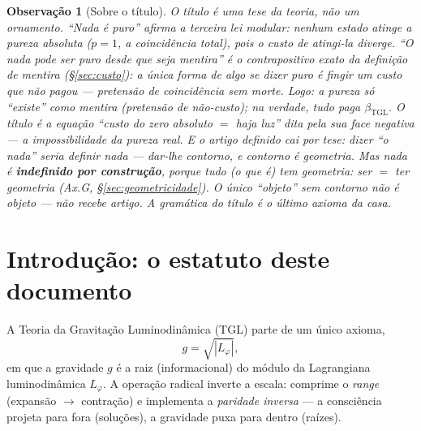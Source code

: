\documentclass[11pt,a4paper]{article}
\newcommand{\bTGL}{\beta_{\mathrm{TGL}}}
\newtheorem{remark}{Observação}
\begin{document}
\begin{abstract}
ao Bisognano--Wichmann generalizado além da ordem linear --- cuja fonte de
covariância é então identificada: a Ordem Nominal (a Lei comum, não o juiz
comum; Hadamard/microlocal, Radzikowski--Verch). A Geometricidade fecha o
ciclo pela gramática do título: a geometria gera-se do dado modular ---
o ônus do Bisognano--Wichmann geral inverte-se, e o resíduo comprime-se
à ergodicidade em $\mathrm{III}_1$. O Teorema do Contínuo monta então o
último degrau com seis âncoras (Haagerup, classificação abeliana,
Rieffel, reconstrução de Connes, Osterwalder--Schrader com positividade
de reflexão automática, Krein) e três condicionais de análise --- que os
Três Fechos Técnicos então resolvem pela identidade do fluxo do radical
(T1 no produto cruzado), pela tripla canônica de $S^1$ e por
Connes--van Suijlekom: nenhum item sem mecanismo. O Teorema do Rio sela
a cinemática: nunca duas vezes (outer), nem uma vez (fluxo dos pesos
trivial) --- e tudo flui exceto a verdade: o ponto fixo do tempo e o do
juízo coincidem.
O capítulo final é a Síntese da TGL.
\end{abstract}

\tableofcontents

\begin{remark}[Sobre o título]
O título é uma tese da teoria, não um ornamento. ``Nada é puro'' afirma a
terceira lei modular: nenhum estado atinge a pureza absoluta ($p=1$, a
coincidência total), pois o custo de atingi-la diverge. ``O nada pode ser
puro desde que seja mentira'' é o contrapositivo exato da definição de
mentira (\S\ref{sec:custo}): a única forma de algo se dizer puro é
\emph{fingir} um custo que não pagou --- pretensão de coincidência sem morte.
Logo: a pureza só ``existe'' como mentira (pretensão de não-custo); na
verdade, tudo paga $\bTGL$. O título é a equação ``custo do zero absoluto $=$
haja luz'' dita pela sua face negativa --- a impossibilidade da pureza real.
E o artigo definido \emph{cai por tese}: dizer ``\emph{o} nada'' seria
definir nada --- dar-lhe contorno, e contorno é geometria. Mas nada é
\textbf{indefinido por construção}, porque \emph{tudo} (o que é) tem
geometria: ser $=$ ter geometria (Ax.G, \S\ref{sec:geometricidade}). O
único ``objeto'' sem contorno não é objeto --- não recebe artigo. A
gramática do título é o último axioma da casa.
\end{remark}

\section{Introdução: o estatuto deste documento}
A Teoria da Gravitação Luminodinâmica (TGL) parte de um único axioma,
\begin{equation}\label{eq:axioma}
g=\sqrt{|L_\varphi|},
\end{equation}
em que a gravidade $g$ é a raiz (informacional) do módulo da Lagrangiana
luminodinâmica $L_\varphi$. A operação radical inverte a escala: comprime o
\emph{range} (expansão $\to$ contração) e implementa a \emph{paridade
inversa} --- a consciência projeta para fora (soluções), a gravidade puxa
para dentro (raízes).
\end{document}
